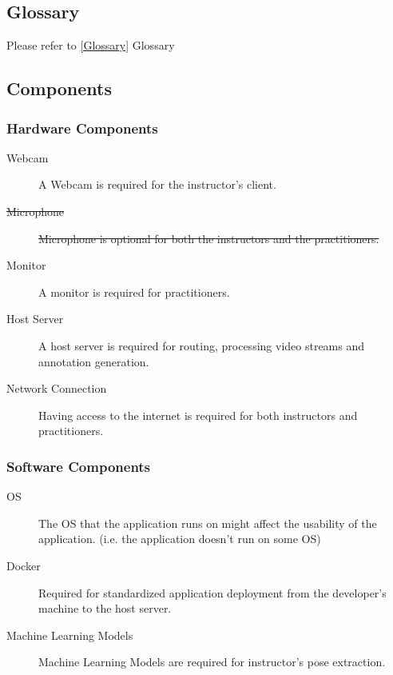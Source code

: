 \documentclass[12pt]{article}
\begin{document}
\subsection{Glossary}
Please refer to \ref*{Glossary} Glossary

\subsection{Components}

\subsubsection{Hardware Components}
\begin{description}
    \item[Webcam] A Webcam is required for the instructor's client.
    \item[\sout{Microphone}] \sout{Microphone is optional for both the instructors and the practitioners.}
    \item[Monitor] A monitor is required for practitioners.
    \item[Host Server] A host server is required for routing, processing video streams and annotation generation.
    \item[Network Connection] Having access to the internet is required for both instructors and practitioners.
\end{description}
\subsubsection{Software Components}
\begin{description}
    \item[OS] The OS that the application runs on might affect the usability of the application. (i.e. the application doesn’t run on some OS)
    \item[Docker] Required for standardized application deployment from the developer’s machine to the host server.
    \item[Machine Learning Models] Machine Learning Models are required for instructor’s pose extraction.
\end{description}
\end{document}
